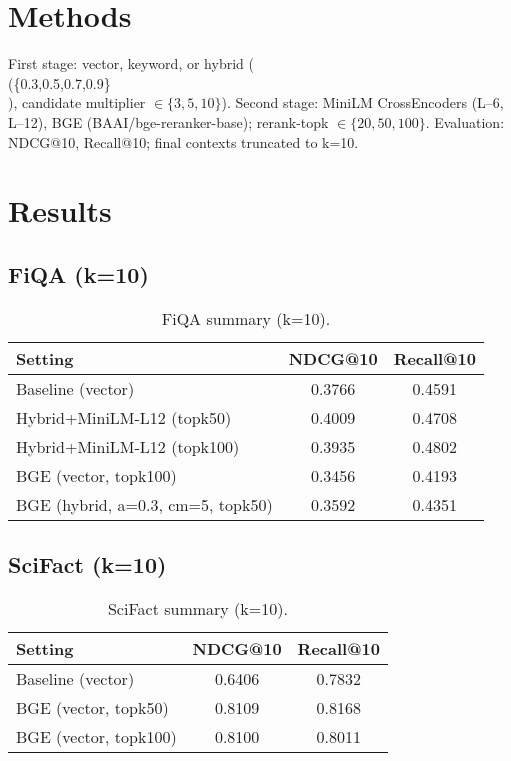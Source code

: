 \documentclass[conference]{IEEEtran}
\begin{document}
\section{Methods}
First stage: vector, keyword, or hybrid (\\(\alpha \in \{0.3,0.5,0.7,0.9\}\\), candidate multiplier \(\in \{3,5,10\}\)). Second stage: MiniLM CrossEncoders (L--6, L--12), BGE (BAAI/bge-reranker-base); rerank-topk \(\in\{20,50,100\}\). Evaluation: NDCG@10, Recall@10; final contexts truncated to k=10.

\section{Results}
\subsection{FiQA (k=10)}
\begin{table}[h]
\centering
\caption{FiQA summary (k=10).}
\begin{tabular}{lcc}
\toprule
Setting & NDCG@10 & Recall@10 \\
\midrule
Baseline (vector) & 0.3766 & 0.4591 \\
Hybrid+MiniLM-L12 (topk50) & 0.4009 & 0.4708 \\
Hybrid+MiniLM-L12 (topk100) & 0.3935 & 0.4802 \\
BGE (vector, topk100) & 0.3456 & 0.4193 \\
BGE (hybrid, a=0.3, cm=5, topk50) & 0.3592 & 0.4351 \\
\bottomrule
\end{tabular}
\label{tab:fiqa}
\end{table}

\subsection{SciFact (k=10)}
\begin{table}[h]
\centering
\caption{SciFact summary (k=10).}
\begin{tabular}{lcc}
\toprule
Setting & NDCG@10 & Recall@10 \\
\midrule
Baseline (vector) & 0.6406 & 0.7832 \\
BGE (vector, topk50) & 0.8109 & 0.8168 \\
BGE (vector, topk100) & 0.8100 & 0.8011 \\
\bottomrule
\end{tabular}
\label{tab:scifact}
\end{table}
\end{document}
